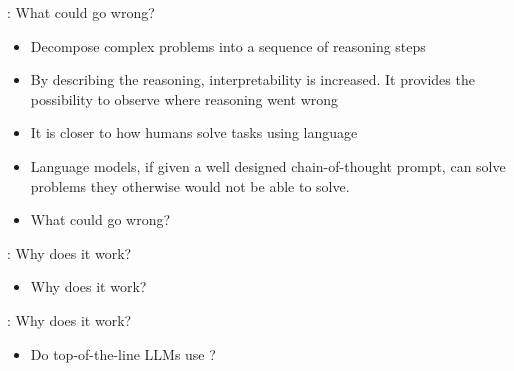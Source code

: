 \begin{frame}{\cotpfull: What could go wrong?}

\vfill

\begin{itemize}
    \item Decompose complex problems into a sequence of reasoning steps
    \item By describing the reasoning, interpretability is increased. It provides the possibility to observe where reasoning went wrong
    \item It is closer to how humans solve tasks using language
    \item Language models, if
given a well designed  chain-of-thought prompt, can
    solve problems they otherwise would not be able to solve.

\item \ques What could go wrong?
\end{itemize}

\vfill

\end{frame}

\begin{frame}{\cotpfull: Why does it work?}

\vfill

\begin{itemize}
    \item \ques Why does it work?
\end{itemize}

\vfill

\end{frame}



\begin{frame}{\cotpfull: Why does it work?}

\vfill

\begin{itemize}
    \item \ques Do top-of-the-line LLMs use \cotpfull?
\end{itemize}

\vfill

\end{frame}

